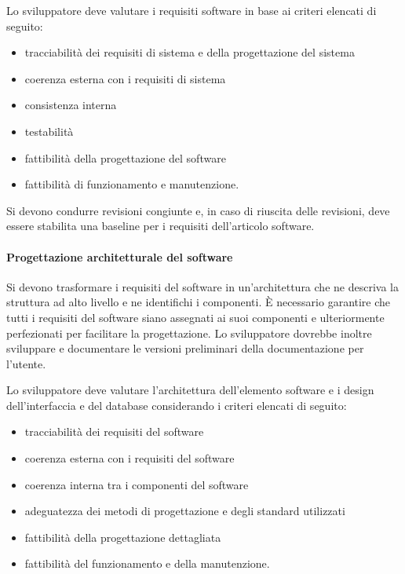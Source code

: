 \documentclass[../../norme-di-progetto.tex]{subfiles}
\begin{document}
Lo sviluppatore deve valutare i requisiti software in base ai criteri elencati di seguito:

\begin{itemize}
  \item tracciabilità dei requisiti di sistema e della progettazione del sistema
  \item coerenza esterna con i requisiti di sistema
  \item consistenza interna
  \item testabilità
  \item fattibilità della progettazione del software
  \item fattibilità di funzionamento e manutenzione.
\end{itemize}

Si devono condurre revisioni congiunte e, in caso di riuscita delle revisioni, deve essere stabilita una baseline per i requisiti dell'articolo software.

\paragraph{Progettazione architetturale del software}%
\label{par:progettazione_architetturale_del_software}

Si devono trasformare i requisiti del software in un'architettura che ne descriva la struttura ad alto livello e ne identifichi i componenti. È necessario garantire che tutti i requisiti del software siano assegnati ai suoi componenti e ulteriormente perfezionati per facilitare la progettazione. Lo sviluppatore dovrebbe inoltre sviluppare e documentare le versioni preliminari della documentazione per l'utente.

Lo sviluppatore deve valutare l'architettura dell'elemento software e i design dell'interfaccia e del database considerando i criteri elencati di seguito:

\begin{itemize}
  \item tracciabilità dei requisiti del software
  \item coerenza esterna con i requisiti del software
  \item coerenza interna tra i componenti del software
  \item adeguatezza dei metodi di progettazione e degli standard utilizzati
  \item fattibilità della progettazione dettagliata
  \item fattibilità del funzionamento e della manutenzione.
\end{itemize}
\end{document}
